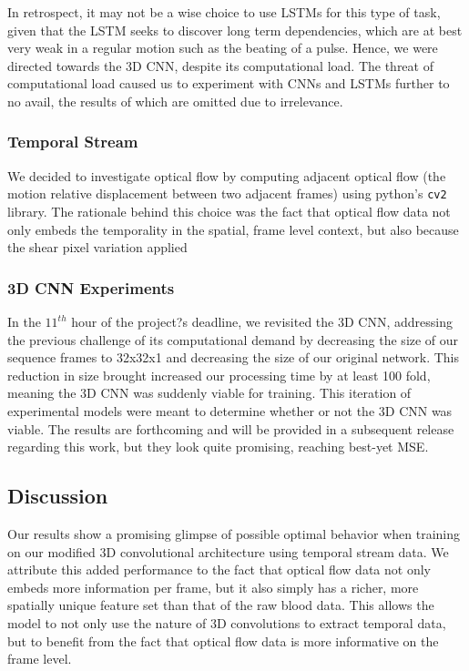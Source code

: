 \documentclass{article}
\begin{document}
In retrospect, it may not be a wise choice to use LSTMs for this type of task, given that the LSTM seeks to discover long term dependencies, which are at best very weak in a regular motion such as the beating of a pulse. Hence, we were directed towards the 3D CNN, despite its computational load. The threat of computational load caused us to experiment with CNNs and LSTMs further to no avail, the results of which are omitted due to irrelevance.
\subsubsection[3.2.3]{Temporal Stream}
We decided to investigate optical flow by computing adjacent optical flow (the motion relative displacement between two adjacent frames) using python's \texttt{cv2} library. The rationale behind this choice was the fact that optical flow data not only embeds the temporality in the spatial, frame level context, but also because the shear pixel variation applied 
\subsubsection[3.2.4]{3D CNN Experiments}
In the $11^{th}$ hour of the project?s deadline, we revisited the 3D CNN, addressing the previous challenge of its computational demand by decreasing the size of our sequence frames to 32x32x1 and decreasing the size of our original network. This reduction in size brought increased our processing time by at least 100 fold, meaning the 3D CNN was suddenly viable for training. This iteration of experimental models were meant to determine whether or not the 3D CNN was viable. The results are forthcoming and will be provided in a subsequent release regarding this work, but they look quite promising, reaching best-yet MSE.
\subsection[3.3] {Discussion}
Our results show a promising glimpse of possible optimal behavior when training on our modified 3D convolutional architecture using temporal stream data. We attribute this added performance to the fact that optical flow data not only embeds more information per frame, but it also simply has a richer, more spatially unique feature set than that of the raw blood data. This allows the model to not only use the nature of 3D convolutions to extract temporal data, but to benefit from the fact that optical flow data is more informative on the frame level.
\end{document}
